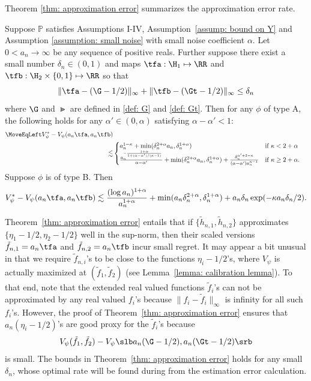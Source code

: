 \documentclass[preprint] {imsart}
\begin{document}
Theorem \ref{thm: approximation error} summarizes the approximation error rate. 
\begin{theorem}
\label{thm: approximation error}
Suppose $\mathbb P$ satisfies Assumptions I-IV, Assumption~\ref{assump: bound on Y} and Assumption \ref{assumption: small noise} with small noise coefficient $\alpha$. Let $0< a_n\to\infty$ be any sequence of positive reals. 
Further suppose there exist a small number $\delta_n\in(0,1)$ and maps $\tfa:\H_1\mapsto\RR$ and $\tfb:\H_2\times\{0,1\}\mapsto\RR$ so that
\[
    \|\tfa-(\G-1/2)\|_{\infty}+\|\tfb-(\Gt-1/2)\|_{\infty}\leq \delta_n
\]
where $\G$ and $\Gt$ are defined in \eqref{def: G} and \eqref{def: Gt}.
 Then for any $\phi$ of type A, the following holds for any $\alpha'\in(0,\alpha)$  satisfying $\alpha-\alpha'<1$:
\begin{align*}
\MoveEqLeft V_\psi^*-V_\psi(a_n\tfa,a_n\tfb)\\
  \lesssim &\begin{cases}
   a_n^{1-\kappa}+\min(\delta_n^{2+\alpha}a_n,\delta_n^{1+\alpha}) & \text{if }\kappa<2+\alpha\\
    \frac{a_n^{-\frac{1+\alpha}{1+(\alpha-\alpha')/(\kappa-1)}}}{\alpha-\alpha'}+\min(\delta_n^{2+\alpha}a_n,\delta_n^{1+\alpha})+\frac{\delta_n^{\alpha'+2-\kappa}}{(\alpha-\alpha')a_n^{\kappa-1}} & \text{if }\kappa\geq 2+\alpha.
   \end{cases}
\end{align*}
Suppose $\phi$ is of type B. Then
 \[V_\psi^*-V_\psi(a_n\tfa,a_n\tfb)\lesssim \frac{(\log a_n)^{1+\alpha}}{a_n^{1+\alpha}}+\min(a_n\delta_n^{2+\alpha},\delta_n^{1+\alpha})+a_n\delta_n\exp(-\kappa a_n \delta_n/2).\]
\end{theorem}

Theorem~\ref{thm: approximation error} entails that if $\{\tilde h_{n,1}, \tilde h_{n,2}\}$ approximates $\{\eta_1-1/2,\eta_2-1/2\}$ well in the sup-norm, then their scaled versions $\tilde f_{n,1}=a_n\tfa$ and $\tilde f_{n,2}=a_n\tfb$ incur small regret. 
 It may appear a bit unusual in that we require $\tilde f_{n,i}$'s to be close to  the functions $\eta_i-1/2$'s, where $V_\psi$ is actually maximized at $(\tilde f_1,\tilde f_2)$ (see Lemma~\ref{lemma: calibration lemma}). To that end, note that  the extended real valued functions $\tilde f_i$'s can not be approximated by any real valued $f_i$'s  because  $\|f_i-\tilde f_i\|_{\infty}$ is infinity for all such  $f_i$'s. However, the proof of Theorem~\ref{thm: approximation error} ensures that $a_n(\eta_i-1/2)$'s are  good proxy for
 the $\tilde f_i$'s because 
 \[V_\psi(\tilde f_1,\tilde f_2)-V_\psi\slb a_n(\G-1/2),a_n(\Gt-1/2)\srb\]
 is  small. The bounds in Theorem~\ref{thm: approximation error} holds for any small $\delta_n$, whose optimal rate will be found during from  the estimation error calculation.
 
\end{document}
